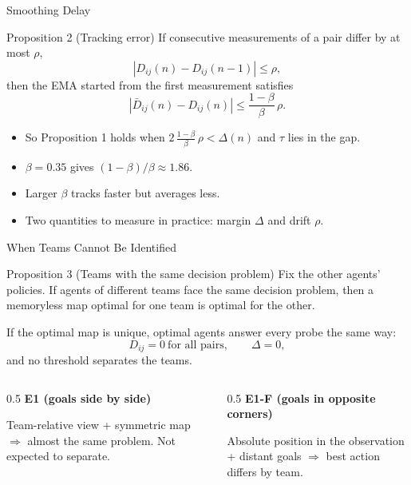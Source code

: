 \documentclass{beamer}
\begin{document}
\begin{frame}{Smoothing Delay}
  \begin{block}{Proposition 2 (Tracking error)}
    If consecutive measurements of a pair differ by at most $\rho$,
    \[
      |D_{ij}(n) - D_{ij}(n-1)| \le \rho,
    \]
    then the EMA started from the first measurement satisfies
    \[
      |\bar D_{ij}(n) - D_{ij}(n)| \le \frac{1-\beta}{\beta}\, \rho .
    \]
  \end{block}

  \begin{itemize}
    \item So Proposition 1 holds when $2\,\frac{1-\beta}{\beta}\,\rho < \Delta(n)$ and $\tau$ lies in the gap.
    \item $\beta = 0.35$ gives $(1-\beta)/\beta \approx 1.86$.
    \item Larger $\beta$ tracks faster but averages less.
    \item Two quantities to measure in practice: margin $\Delta$ and drift $\rho$.
  \end{itemize}
\end{frame}

\begin{frame}{When Teams Cannot Be Identified}
  \begin{block}{Proposition 3 (Teams with the same decision problem)}
    Fix the other agents' policies. If agents of different teams face the same decision problem, then a memoryless map optimal for one team is optimal for the other.

    \medskip
    If the optimal map is unique, optimal agents answer every probe the same way:
    \[
      D_{ij} = 0 \ \text{for all pairs}, \qquad \Delta = 0,
    \]
    and no threshold separates the teams.
  \end{block}

  \begin{columns}[T]
    \begin{column}{0.5\textwidth}
      \textbf{E1 (goals side by side)}

      Team-relative view + symmetric map $\Rightarrow$ almost the same problem. Not expected to separate.
    \end{column}
    \begin{column}{0.5\textwidth}
      \textbf{E1-F (goals in opposite corners)}

      Absolute position in the observation + distant goals $\Rightarrow$ best action differs by team.
    \end{column}
  \end{columns}
\end{frame}
\end{document}
